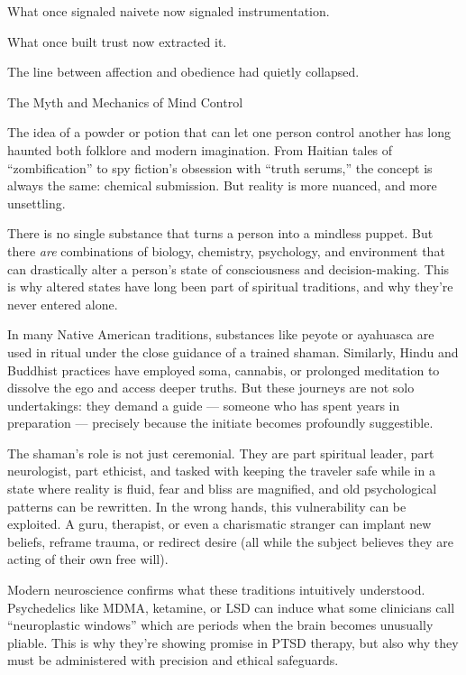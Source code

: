 What once signaled naivete now signaled instrumentation.

What once built trust now extracted it.

The line between affection and obedience had quietly collapsed.

\medskip

\begin{PsychologicalSidebar}{The Myth and Mechanics of Mind Control}

  The idea of a powder or potion that can let one person control another has long haunted both folklore and modern 
  imagination. From Haitian tales of “zombification” to spy fiction's obsession with “truth serums,” the concept is 
  always the same: chemical submission. But reality is more nuanced, and more unsettling.

  \medskip
  
  There is no single substance that turns a person into a mindless puppet. But there \emph{are} combinations of biology, 
  chemistry, psychology, and environment that can drastically alter a person’s state of consciousness and decision-making. 
  This is why altered states have long been part of spiritual traditions, and why they’re never entered alone.

  \medskip
  
  In many Native American traditions, substances like peyote or ayahuasca are used in ritual under the close guidance of 
  a trained shaman. Similarly, Hindu and Buddhist practices have employed soma, cannabis, or prolonged meditation 
  to dissolve the ego and access deeper truths. But these journeys are not solo undertakings: they demand a guide — 
  someone who has spent years in preparation — precisely because the initiate becomes profoundly suggestible. 

  \medskip
  
  The shaman’s role is not just ceremonial. They are part spiritual leader, part neurologist, part ethicist, and tasked with 
  keeping the traveler safe while in a state where reality is fluid, fear and bliss are magnified, and old psychological 
  patterns can be rewritten. In the wrong hands, this vulnerability can be exploited. A guru, therapist, or even a 
  charismatic stranger can implant new beliefs, reframe trauma, or redirect desire (all while the subject believes they 
  are acting of their own free will).

  \medskip
  
  Modern neuroscience confirms what these traditions intuitively understood. Psychedelics like MDMA, ketamine, or LSD 
  can induce what some clinicians call “neuroplastic windows” which are periods when the brain becomes unusually 
  pliable. This is why they’re showing promise in PTSD therapy, but also why they must be administered with 
  precision and ethical safeguards. 


\end{PsychologicalSidebar}
